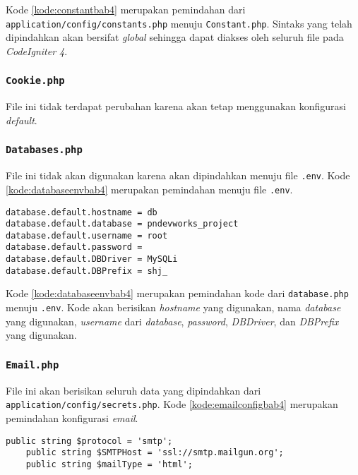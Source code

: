 Kode \ref{kode:constantbab4} merupakan pemindahan dari \texttt{application/config/constants.php} menuju \texttt{Constant.php}. Sintaks yang telah dipindahkan akan bersifat \textit{global} sehingga dapat diakses oleh seluruh file pada \textit{CodeIgniter 4}.

\subsubsection{\texttt{Cookie.php}}
File ini tidak terdapat perubahan karena akan tetap menggunakan konfigurasi \textit{default}.

\subsubsection{\texttt{Databases.php}}
File ini tidak akan digunakan karena akan dipindahkan menuju file \texttt{.env}. Kode \ref{kode:databaseenvbab4} merupakan pemindahan menuju file \texttt{.env}.

\begin{lstlisting}[caption=Pemindahan \texttt{app/config/database.php} menuju \texttt{.env}, label=kode:databaseenvbab4]
database.default.hostname = db
database.default.database = pndevworks_project
database.default.username = root
database.default.password = 
database.default.DBDriver = MySQLi
database.default.DBPrefix = shj_
\end{lstlisting}

Kode \ref{kode:databaseenvbab4} merupakan pemindahan kode dari \texttt{database.php} menuju \texttt{.env}. Kode akan berisikan \textit{hostname} yang digunakan, nama \textit{database} yang digunakan, \textit{username} dari \textit{database}, \textit{password}, \textit{DBDriver}, dan \textit{DBPrefix} yang digunakan.

\subsubsection{\texttt{Email.php}}
File ini akan berisikan seluruh data yang dipindahkan dari \texttt{application/config/secrets.php}. Kode \ref{kode:emailconfigbab4} merupakan pemindahan konfigurasi \textit{email}.

\begin{lstlisting}[caption=Pemindahan \texttt{app/config/secrets.php} menuju \texttt{Email.php}, label=kode:emailconfigbab4]
    public string $protocol = 'smtp';
    public string $SMTPHost = 'ssl://smtp.mailgun.org';
    public string $mailType = 'html';
\end{lstlisting}

